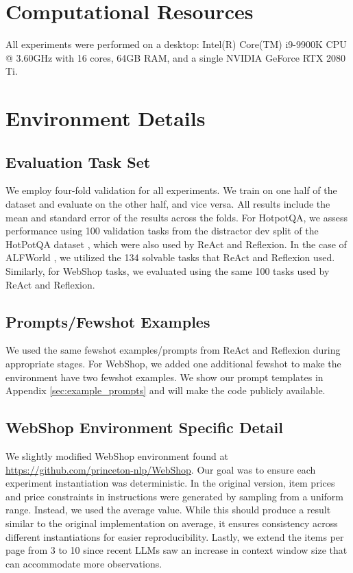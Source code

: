 \documentclass[letterpaper]{article} %
\begin{document}
\section{Computational Resources}
\label{sec:computational_resources}
All experiments were performed on a desktop: Intel(R) Core(TM) i9-9900K CPU @ 3.60GHz with 16 cores, 64GB RAM, and a single NVIDIA GeForce RTX 2080 Ti.

\section{Environment Details}
\label{sec:env_details}
\subsection{Evaluation Task Set}
\label{sec:eval_task_set}
We employ four-fold validation for all experiments. We train on one half of the dataset and evaluate on the other half, and vice versa. All results include the mean and standard error of the results across the folds. For HotpotQA, we assess performance using 100 validation tasks from the distractor dev split of the HotPotQA dataset \cite{yang2018hotpotqa}, which were also used by ReAct and Reflexion. In the case of ALFWorld \cite{shridhar2020alfworld}, we utilized the 134 solvable tasks that ReAct and Reflexion used. Similarly, for WebShop tasks, we evaluated using the same 100 tasks used by ReAct and Reflexion.

\subsection{Prompts/Fewshot Examples}
\label{sec:prompts}
We used the same fewshot examples/prompts from ReAct and Reflexion \cite{yao2022react,shinn2023reflexion} during appropriate stages. For WebShop, we added one additional fewshot to make the environment have two fewshot examples. We show our prompt templates in Appendix \ref{sec:example_prompts} and will make the code publicly available.

\subsection{WebShop Environment Specific Detail}
\label{sec:webshop_env_implementation}
We slightly modified WebShop environment found at \url{https://github.com/princeton-nlp/WebShop}. Our goal was to ensure each experiment instantiation was deterministic. In the original version, item prices and price constraints in instructions were generated by sampling from a uniform range. Instead, we used the average value. While this should produce a result similar to the original implementation on average, it ensures consistency across different instantiations for easier reproducibility. Lastly, we extend the items per page from 3 to 10 since recent LLMs saw an increase in context window size that can accommodate more observations.
\end{document}
